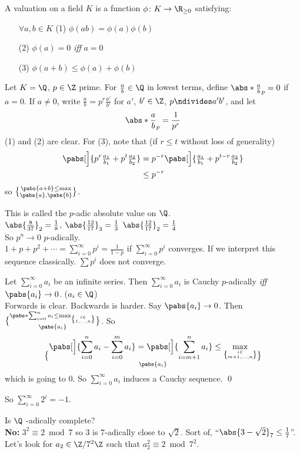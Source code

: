  A valuation on a field $K$ is a function $\phi\colon K\to\R_{\geq0}$ satisfying:
\begin{enumerate}%
\item[$\forall a,b\in K$ (1)] $\phi(ab)=\phi(a)\phi(b)$
\item[(2)] $\phi(a)=0$ \emph{iff} $a=0$
\item[(3)] $\phi(a+b)\leq\phi(a)+\phi(b)$
\end{enumerate}
\eg Let $K=\Q$, $p\in\Z$ prime.  For $\frac ab\in\Q$ in lowest terms, define $\abs*{\frac ab}_p=0$ if $a=0$.  If $a\neq0$, write $\frac ab=p^r\frac{a'}{b'}$ for $a'$, $b'\in\Z$, $p\ndivides a'b'$, and let
\[ \abs*{\frac ab}_p = \frac{1}{p^r} \]
(1) and (2) are clear.  For (3), note that (if $r\leq t$ without loss of generality)
\begin{align*}
\pabs[\Big]{p^r\tfrac{a_1}{b_1}+p^t\tfrac{a_2}{b_2}} &= p^{-r}\pabs[\Big]{\tfrac{a_1}{b_1}+p^{t-r}\tfrac{a_2}{b_2}} \\
&\leq p^{-r}
\end{align*}
so $\pabs{a+b}\leq\max\brace{\pabs{a},\pabs{b}}$.

This is called the $p$-adic absolute value on $\Q$. \\
\eg $\abs{\frac{8}{37}}_2=\frac18$, $\abs{\frac{12}{17}}_3=\frac13$ $\abs{\frac{12}{17}}_2=\frac14$ \\
So $p^n\to0$ $p$-adically. \\
\eg $1+p+p^2+\dotsb=\sum_{i=0}^\infty p^i=\frac{1}{1-p}$ if $\sum_{i=0}^\infty p^i$ converges.  If we interpret this sequence classically.  $\sum p^i$ does not converge.

\thm Let $\sum_{i=0}^\infty a_i$ be an infinite series.  Then $\sum_{i=0}^\infty a_i$ is Cauchy $p$-adically \emph{iff} $\pabs{a_i}\to0$. ($a_i\in\Q$) \\
\pf Forwards is clear.  Backwards is harder.  Say $\pabs{a_i}\to0$.  Then $\pabs*{\sum_{i=0}^n a_i}\leq\max_{i\in\brace{1,\dotsc,n}}\brace{\pabs{a_i}}$.  So
\[ \pabs[\Big]{\sum_{i=0}^n a_i-\sum_{i=0}^m a_i} = \pabs[\Big]{\sum_{i=m+1}^n a_i} \leq \max_{i\in\brace{m+1,\dotsc,n}}\brace{\pabs{a_i}} \]
which is going to $0$.  So $\sum_{i=0}^\infty a_i$ induces a Cauchy sequence. \qed

So $\sum_{i=0}^\infty 2^i=-1$.

Is $\Q$ \p-adically complete? \\
\textbf{No: }$3^2\equiv2\bmod7$ so $3$ is $7$-adically close to $\sqrt2$.  Sort of, ``$\abs{3-\sqrt2}_7\leq\frac17$''.  \\
Let's look for $a_2\in\Z/7^2\Z$ such that $a_2^2\equiv2\bmod7^2$.

